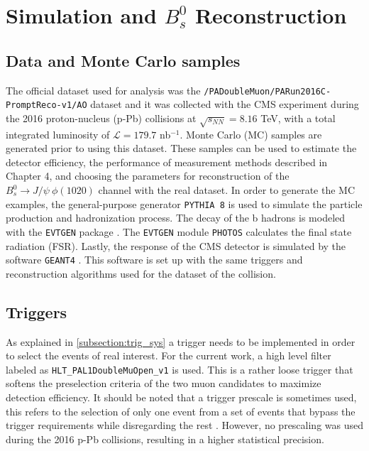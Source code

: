 \chapter[\leavevmode\newline Simulation and $B^0_s$ Reconstruction]{Simulation and $B^0_s$ Reconstruction}
\label{chap:Chapter_3}
\section{Data and Monte Carlo samples}
The official dataset used for analysis was the \verb|/PADoubleMuon/PARun2016C-PromptReco-v1/AO| dataset and it was collected with the CMS experiment during the 2016 proton-nucleus (p-Pb) collisions at $\sqrt{s_{NN}} = 8.16$ TeV, with a total integrated luminosity of $\mathcal{L} = 179.7$ nb$^{-1}$. Monte Carlo (MC) samples are generated prior to using this dataset. These samples can be used to estimate the detector efficiency, the performance of measurement methods described in Chapter 4, and choosing the parameters for reconstruction  of the $B^0_s \to J/\psi \ \phi(1020)$ channel with the real dataset. In order to generate the MC examples, the general-purpose generator \verb|PYTHIA 8| \cite{sjostrand2015introduction} is used to simulate the particle production and hadronization process. The decay of the b hadrons is modeled with the \verb|EVTGEN| package \cite{lange2001evtgen}. The \verb|EVTGEN| module \verb|PHOTOS| \cite{davidson2016photos} calculates the final state radiation (FSR). Lastly, the response of the CMS detector is simulated by the software \verb|GEANT4| \cite{agostinelli2003geant4}. This software is set up with the same triggers and reconstruction algorithms used for the dataset of the collision. %

\section{Triggers}
As explained in \ref{subsection:trig_sys} a trigger needs to be implemented in order to select the events of real interest. For the current work, a high level filter labeled as \verb|HLT_PAL1DoubleMuOpen_v1| is used. This is a rather loose trigger that softens the preselection criteria of the two muon candidates to maximize detection efficiency. It should be noted that a trigger prescale is sometimes used, this refers to the selection of only one event from a set of events that bypass the trigger requirements while disregarding the rest \cite{dorigo_2014}. However, no prescaling was used during the 2016 p-Pb collisions, resulting in a higher statistical precision.

